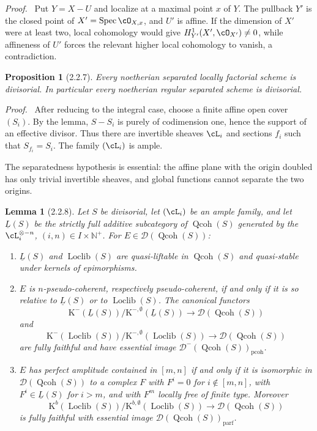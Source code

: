 \documentclass[11pt]{article}
\theoremstyle{plain}
\newtheorem*{proposition*}{Proposition}
\newtheorem*{lemma*}{Lemma}
\theoremstyle{definition}
\theoremstyle{remark}
\newenvironment{prooftext}{\par\noindent\textit{Proof.}\ }{\par\medskip}
\newcommand{\NN}{\mathbb N}
\newcommand{\D}{\mathcal D}\newcommand{\E}{\mathcal E}\newcommand{\F}{\mathcal F}
\DeclareMathOperator{\Spec}{Spec}
\providecommand{\K}{\mathrm K}
\providecommand{\Qcoh}{\operatorname{Qcoh}}
\providecommand{\Loclib}{\operatorname{Loclib}}
\begin{document}
\begin{prooftext}
Put $Y=X-U$ and localize at a maximal point $x$ of $Y$. The pullback $Y'$ is the closed point of $X'=\Spec\cO_{X,x}$, and $U'$ is affine. If the dimension of $X'$ were at least two, local cohomology would give $H^1_{Y'}(X',\cO_{X'})\ne0$, while affineness of $U'$ forces the relevant higher local cohomology to vanish, a contradiction.
\end{prooftext}

\begin{proposition*}[2.2.7]
Every noetherian separated locally factorial scheme is divisorial. In particular every noetherian regular separated scheme is divisorial.
\end{proposition*}

\begin{prooftext}
After reducing to the integral case, choose a finite affine open cover $(S_i)$. By the lemma, $S-S_i$ is purely of codimension one, hence the support of an effective divisor. Thus there are invertible sheaves $\cL_i$ and sections $f_i$ such that $S_{f_i}=S_i$. The family $(\cL_i)$ is ample.
\end{prooftext}

The separatedness hypothesis is essential: the affine plane with the origin doubled has only trivial invertible sheaves, and global functions cannot separate the two origins.

\begin{lemma*}[2.2.8]
Let $S$ be divisorial, let $(\cL_i)$ be an ample family, and let $\underline L(S)$ be the strictly full additive subcategory of $\Qcoh(S)$ generated by the $\cL_i^{\otimes -n}$, $(i,n)\in I\times\NN^+$. For $E\in\D(\Qcoh(S))$:
\begin{enumerate}[label=\alph*)]
\item $\underline L(S)$ and $\Loclib(S)$ are quasi-liftable in $\Qcoh(S)$ and quasi-stable under kernels of epimorphisms.
\item $E$ is $n$-pseudo-coherent, respectively pseudo-coherent, if and only if it is so relative to $\underline L(S)$ or to $\Loclib(S)$. The canonical functors
\[
\K^-(\underline L(S))/\K^{-,\emptyset}(\underline L(S))\to\D(\Qcoh(S))
\]
and
\[
\K^-(\Loclib(S))/\K^{-,\emptyset}(\Loclib(S))\to\D(\Qcoh(S))
\]
are fully faithful and have essential image $\D^-(\Qcoh(S))_{\mathrm{pcoh}}$.
\item $E$ has perfect amplitude contained in $[m,n]$ if and only if it is isomorphic in $\D(\Qcoh(S))$ to a complex $F$ with $F^i=0$ for $i\notin[m,n]$, with $F^i\in\underline L(S)$ for $i>m$, and with $F^m$ locally free of finite type. Moreover
\[
\K^b(\Loclib(S))/\K^{b,\emptyset}(\Loclib(S))\to\D(\Qcoh(S))
\]
is fully faithful with essential image $\D(\Qcoh(S))_{\mathrm{parf}}$.
\end{enumerate}
\end{lemma*}
\end{document}
